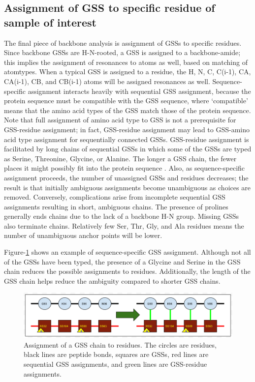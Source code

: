 \subsection{Assignment of GSS to specific residue of sample of interest}

The final piece of backbone analysis is assignment of GSSs to specific 
residues.  Since backbone GSSs are H-N-rooted, a GSS is assigned to a 
backbone-amide; this implies the assignment of resonances to atoms as well, 
based on matching of atomtypes.  When a typical GSS is assigned to a residue, 
the H, N, C, C(i-1), CA, CA(i-1), CB, and CB(i-1) atoms will be assigned 
resonances as well.  Sequence-specific assignment interacts heavily with 
sequential GSS assignment, because the protein sequence must be compatible 
with the GSS sequence, where `compatible' means that the amino acid types 
of the GSS match those of the protein sequence.  Note that full assignment 
of amino acid type to GSS is not a prerequisite for GSS-residue assignment; 
in fact, GSS-residue assignment may lead to GSS-amino acid type assignment 
for sequentially connected GSSs.  GSS-residue assignment is facilitated by 
long chains of sequential GSSs in which some of the GSSs are typed as Serine, 
Threonine, Glycine, or Alanine.  The longer a GSS chain, the fewer places it 
might possibly fit into the protein sequence \cite{saga}.  Also, 
as sequence-specific assignment proceeds, the number of unassigned GSSs and 
residues decreases; the result is that initially ambiguous assignments become 
unambiguous as choices are removed.  Conversely, complications arise from 
incomplete sequential GSS assignments resulting in short, ambiguous chains.  
The presence of prolines generally ends chains due to the lack of a backbone 
H-N group.  Missing GSSs also terminate chains.  Relatively few Ser, Thr, Gly, 
and Ala residues means the number of unambiguous anchor points will be lower.

Figure-\ref{ss-residue} shows an example of sequence-specific GSS assignment.
Although not all of the GSSs have been typed, the presence of a Glycine and
Serine in the GSS chain reduces the possible assignments to residues.
Additionally, the length of the GSS chain helps reduce the ambiguity compared
to shorter GSS chains.
\begin{figure}
  \includegraphics[scale=0.45]{figures/ss-residue}
  \caption[Assignment of a GSS chain to residues]
          {Assignment of a GSS chain to residues.  The circles are residues,
           black lines are peptide bonds, squares are GSSs, red lines are 
           sequential GSS assignments, and green lines are GSS-residue 
           assignments.}
  \label{ss-residue}
\end{figure}


